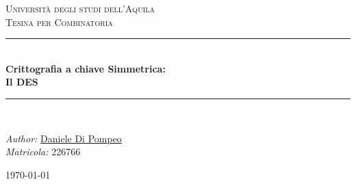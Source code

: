 \documentclass[11pt, a4paper, oneside]{Thesis} %
\title{\ttitle} %
\begin{document}
\frontmatter %


\fancyhead{} %
\rhead{\thepage} %
\lhead{} %

\pagestyle{fancy} %

\newcommand{\HRule}{\rule{\linewidth}{0.5mm}} %

\hypersetup{pdfsubject=\subjectname}
\hypersetup{pdfauthor=\authornames}
\hypersetup{pdfkeywords=\keywordnames}


\begin{titlepage}
\begin{center}

\textsc{\LARGE Università degli studi dell'Aquila}\\[1.5cm] %
\textsc{\Large Tesina per Combinatoria }\\[0.5cm] %

\HRule \\[0.4cm] %
{\huge \bfseries Crittografia a chiave Simmetrica:\\[0.6cm] Il DES}\\[0.4cm] %
\HRule \\[1.5cm] %
 
\begin{minipage}{1\textwidth}
\begin{flushleft} \large
\emph{Author: }\href{http://www.linkedin.com/profile/view?id=148386176}{Daniele Di Pompeo} %
\\\small{\emph{Matricola: } 226766}
\end{flushleft}
\end{minipage}
 
{\large \today}\\[4cm] %
 
\vfill
\end{center}

\end{titlepage}
\end{document}
